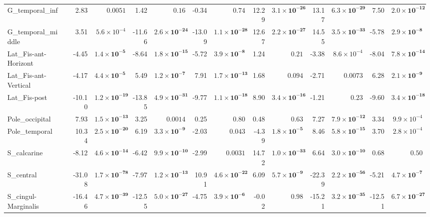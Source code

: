 {\begin{longtable}{llrrrrrrrrrrrr}
G\_temporal\_inf &  & 2.83 & $0.0051$ & 1.42 & $0.16$ & -0.34 & $0.74$ & 12.29 & $\mathbf{3.1{\times}10^{-26}}$ & 13.17 & $\mathbf{6.3{\times}10^{-29}}$ & 7.50 & $\mathbf{2.0{\times}10^{-12}}$ \\
G\_temporal\_middle &  & 3.51 & $5.6{\times}10^{-4}$ & -11.66 & $\mathbf{2.6{\times}10^{-24}}$ & -13.09 & $\mathbf{1.1{\times}10^{-28}}$ & 12.67 & $\mathbf{2.2{\times}10^{-27}}$ & 14.55 & $\mathbf{3.5{\times}10^{-33}}$ & -5.78 & $\mathbf{2.9{\times}10^{-8}}$ \\
Lat\_Fis-ant-Horizont &  & -4.45 & $\mathbf{1.4{\times}10^{-5}}$ & -8.64 & $\mathbf{1.8{\times}10^{-15}}$ & -5.72 & $\mathbf{3.9{\times}10^{-8}}$ & 1.24 & $0.21$ & -3.38 & $8.6{\times}10^{-4}$ & -8.04 & $\mathbf{7.8{\times}10^{-14}}$ \\
Lat\_Fis-ant-Vertical &  & -4.17 & $\mathbf{4.4{\times}10^{-5}}$ & 5.49 & $\mathbf{1.2{\times}10^{-7}}$ & 7.91 & $\mathbf{1.7{\times}10^{-13}}$ & 1.68 & $0.094$ & -2.71 & $0.0073$ & 6.28 & $\mathbf{2.1{\times}10^{-9}}$ \\
Lat\_Fis-post &  & -10.10 & $\mathbf{1.2{\times}10^{-19}}$ & -13.85 & $\mathbf{4.9{\times}10^{-31}}$ & -9.77 & $\mathbf{1.1{\times}10^{-18}}$ & 8.90 & $\mathbf{3.4{\times}10^{-16}}$ & -1.21 & $0.23$ & -9.60 & $\mathbf{3.4{\times}10^{-18}}$ \\
Pole\_occipital &  & 7.93 & $\mathbf{1.5{\times}10^{-13}}$ & 3.25 & $0.0014$ & 0.25 & $0.80$ & 0.48 & $0.63$ & 7.27 & $\mathbf{7.9{\times}10^{-12}}$ & 3.34 & $9.9{\times}10^{-4}$ \\
Pole\_temporal &  & 10.34 & $\mathbf{2.5{\times}10^{-20}}$ & 6.19 & $\mathbf{3.3{\times}10^{-9}}$ & -2.03 & $0.043$ & -4.39 & $\mathbf{1.8{\times}10^{-5}}$ & 8.46 & $\mathbf{5.8{\times}10^{-15}}$ & 3.70 & $2.8{\times}10^{-4}$ \\
S\_calcarine &  & -8.12 & $\mathbf{4.6{\times}10^{-14}}$ & -6.42 & $\mathbf{9.9{\times}10^{-10}}$ & -2.99 & $0.0031$ & 14.72 & $\mathbf{1.0{\times}10^{-33}}$ & 6.64 & $\mathbf{3.0{\times}10^{-10}}$ & 0.68 & $0.50$ \\
S\_central &  & -31.08 & $\mathbf{1.7{\times}10^{-78}}$ & -7.97 & $\mathbf{1.2{\times}10^{-13}}$ & 10.91 & $\mathbf{4.6{\times}10^{-22}}$ & 6.09 & $\mathbf{5.7{\times}10^{-9}}$ & -22.39 & $\mathbf{2.2{\times}10^{-56}}$ & -5.21 & $\mathbf{4.7{\times}10^{-7}}$ \\
S\_cingul-Marginalis &  & -16.46 & $\mathbf{4.7{\times}10^{-39}}$ & -12.55 & $\mathbf{5.0{\times}10^{-27}}$ & -4.75 & $\mathbf{3.9{\times}10^{-6}}$ & -0.02 & $0.98$ & -15.21 & $\mathbf{3.2{\times}10^{-35}}$ & -12.51 & $\mathbf{6.7{\times}10^{-27}}$ \\

\end{longtable}}
